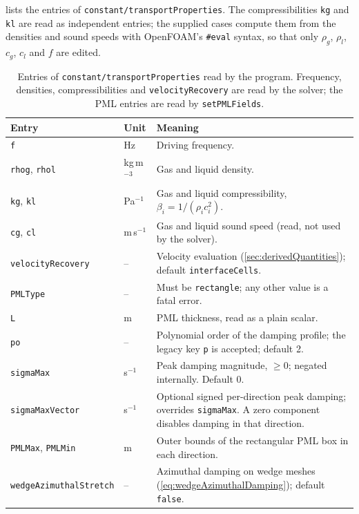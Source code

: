 \documentclass[final,12pt,nopreprintline]{elsarticle}
\newcommand{\code}[1]{\texttt{#1}}
\begin{document}
 lists the entries of
\code{constant/transportProperties}.  The compressibilities \code{kg} and
\code{kl} are read as independent entries; the supplied cases compute them
from the densities and sound speeds with OpenFOAM's \code{\#eval} syntax, so
that only $\rho_g$, $\rho_l$, $c_g$, $c_l$ and $f$ are edited.  
\begin{table}[htbp]
    \centering
    \caption{Entries of \code{constant/transportProperties} read by the
    program.  Frequency, densities, compressibilities and
    \code{velocityRecovery} are read by the solver; the PML entries are read
    by \code{setPMLFields}.}
    \label{tab:transportProperties}
    \small
    \begin{tabular}{@{}llp{}@{}}
        \toprule
        Entry & Unit & Meaning \\
        \midrule
        \code{f} & Hz & Driving frequency.\\
        \code{rhog}, \code{rhol} & kg\,m$^{-3}$ & Gas and liquid density.\\
        \code{kg}, \code{kl} & Pa$^{-1}$ & Gas and liquid compressibility,
        $\beta_i=1/(\rho_ic_i^2)$.\\
        \code{cg}, \code{cl} & m\,s$^{-1}$ & Gas and liquid sound speed (read,
        not used by the solver).\\
        \code{velocityRecovery} & -- & Velocity evaluation
        (\cref{sec:derivedQuantities}); default \code{interfaceCells}.\\
        \code{PMLType} & -- & Must be \code{rectangle}; any other value is a
        fatal error.\\
        \code{L} & m & PML thickness, read as a plain scalar.\\
        \code{po} & -- & Polynomial order of the damping profile; the legacy
        key \code{p} is accepted; default 2.\\
        \code{sigmaMax} & s$^{-1}$ & Peak damping magnitude, $\ge0$; negated
        internally.  Default 0.\\
        \code{sigmaMaxVector} & s$^{-1}$ & Optional signed per-direction peak
        damping; overrides \code{sigmaMax}.  A zero component disables damping
        in that direction.\\
        \code{PMLMax}, \code{PMLMin} & m & Outer bounds of the rectangular
        PML box in each direction.\\
        \code{wedgeAzimuthalStretch} & -- & Azimuthal damping on wedge meshes
        (\cref{eq:wedgeAzimuthalDamping}); default \code{false}.\\
        \bottomrule
    \end{tabular}
\end{table}
\end{document}
